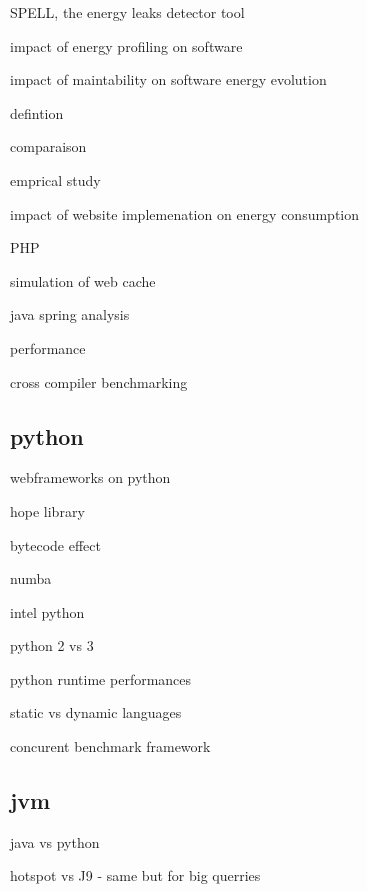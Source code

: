 SPELL, the energy leaks detector tool \cite{pereira2017helping}

impact of energy profiling on software \cite{jagroep2017energy}

impact of maintability on software energy evolution \cite{calero2021does}

defintion \cite{wang1993grpc}

comparaison \cite{chamas2017comparing}

emprical study \cite{de2021empirical}

impact of website implemenation on energy consumption \cite{philippot_characterization_2014} \cite{manotas2013investigating}

PHP \cite{benmoussa_new_2019} \cite{das_comparison_2016}

simulation of web cache \cite{cardenas_performance_2005}

java spring analysis \cite{gajewski_analysis_2019}

performance \cite{mishra2021web}


cross compiler benchmarking \cite{yet2016cross}

\subsection{python}

webframeworks on python \cite{pankiv_concurrent_nodate}

hope library \cite{akeret_hope_2015}

bytecode effect \cite{ben_asher_effect_2009}

numba \cite{crist_dask_2016}

intel python \cite{li_boosting_2016}

python 2 vs 3 \cite{modzelewski_pyston_2020}

python runtime performances \cite{redondo_comprehensive_2015} \cite{murri_performance_2013}

static vs dynamic languages \cite{pang_what_nodate}

concurent benchmark framework \cite{pankiv2019concurrent}


\subsection{jvm}

java vs python \cite{destefanis_statistical_2016}

hotspot vs J9 \cite{oi2011power} - same but for big querries \cite{chiba2018towards}

